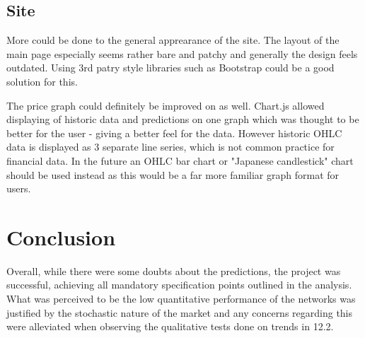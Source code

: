         \subsection{Site}
        More could be done to the general apprearance of the site. The layout of the main page especially seems rather bare and patchy and generally the design feels outdated. Using 3rd patry style libraries such as Bootstrap could be a good solution for this.

        The price graph could definitely be improved on as well. Chart.js allowed displaying of historic data and predictions on one graph which was thought to be better for the user - giving a better feel for the data. However historic OHLC data is displayed as 3 separate line series, which is not common practice for financial data. In the future an OHLC bar chart or "Japanese candlestick" chart should be used instead as this would be a far more familiar graph format for users.

    \section{Conclusion}
    Overall, while there were some doubts about the predictions, the project was successful, achieving all mandatory specification points outlined in the analysis. What was perceived to be the low quantitative performance of the networks was justified by the stochastic nature of the market and any concerns regarding this were alleviated when observing the qualitative tests done on trends in 12.2.
